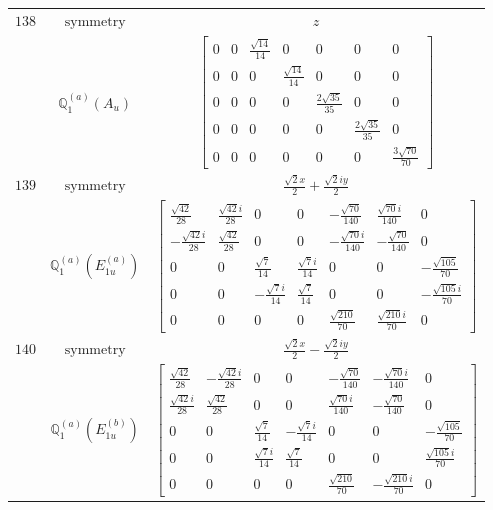 \documentclass[fleqn,8pt,landscape]{jsarticle}
\begin{document}
\begin{longtable}{ccc}
$ 138 $ & $ \text{symmetry} $ & $ z $ \\
$  $ & $ \mathbb{Q}_{1}^{(a)}(A_{u}) $ & $ \begin{bmatrix} 0 & 0 & \frac{\sqrt{14}}{14} & 0 & 0 & 0 & 0 \\ 0 & 0 & 0 & \frac{\sqrt{14}}{14} & 0 & 0 & 0 \\ 0 & 0 & 0 & 0 & \frac{2 \sqrt{35}}{35} & 0 & 0 \\ 0 & 0 & 0 & 0 & 0 & \frac{2 \sqrt{35}}{35} & 0 \\ 0 & 0 & 0 & 0 & 0 & 0 & \frac{3 \sqrt{70}}{70} \end{bmatrix} $ \\ \hline
$ 139 $ & $ \text{symmetry} $ & $ \frac{\sqrt{2} x}{2} + \frac{\sqrt{2} i y}{2} $ \\
$  $ & $ \mathbb{Q}_{1}^{(a)}(E_{1u}^{(a)}) $ & $ \begin{bmatrix} \frac{\sqrt{42}}{28} & \frac{\sqrt{42} i}{28} & 0 & 0 & - \frac{\sqrt{70}}{140} & \frac{\sqrt{70} i}{140} & 0 \\ - \frac{\sqrt{42} i}{28} & \frac{\sqrt{42}}{28} & 0 & 0 & - \frac{\sqrt{70} i}{140} & - \frac{\sqrt{70}}{140} & 0 \\ 0 & 0 & \frac{\sqrt{7}}{14} & \frac{\sqrt{7} i}{14} & 0 & 0 & - \frac{\sqrt{105}}{70} \\ 0 & 0 & - \frac{\sqrt{7} i}{14} & \frac{\sqrt{7}}{14} & 0 & 0 & - \frac{\sqrt{105} i}{70} \\ 0 & 0 & 0 & 0 & \frac{\sqrt{210}}{70} & \frac{\sqrt{210} i}{70} & 0 \end{bmatrix} $ \\ \hline
$ 140 $ & $ \text{symmetry} $ & $ \frac{\sqrt{2} x}{2} - \frac{\sqrt{2} i y}{2} $ \\
$  $ & $ \mathbb{Q}_{1}^{(a)}(E_{1u}^{(b)}) $ & $ \begin{bmatrix} \frac{\sqrt{42}}{28} & - \frac{\sqrt{42} i}{28} & 0 & 0 & - \frac{\sqrt{70}}{140} & - \frac{\sqrt{70} i}{140} & 0 \\ \frac{\sqrt{42} i}{28} & \frac{\sqrt{42}}{28} & 0 & 0 & \frac{\sqrt{70} i}{140} & - \frac{\sqrt{70}}{140} & 0 \\ 0 & 0 & \frac{\sqrt{7}}{14} & - \frac{\sqrt{7} i}{14} & 0 & 0 & - \frac{\sqrt{105}}{70} \\ 0 & 0 & \frac{\sqrt{7} i}{14} & \frac{\sqrt{7}}{14} & 0 & 0 & \frac{\sqrt{105} i}{70} \\ 0 & 0 & 0 & 0 & \frac{\sqrt{210}}{70} & - \frac{\sqrt{210} i}{70} & 0 \end{bmatrix} $ \\ \hline

\end{longtable}
\end{document}
